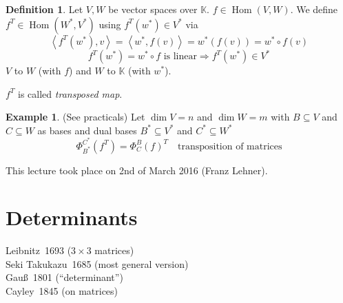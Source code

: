 \documentclass[a4paper,landscape,twocolumn]{article}
\newcommand\meta[3]{This #1 took place on #2 (#3).\par}
\newcommand\functional[1]{\left\langle{#1}\right\rangle}
\theoremstyle{definition}
\newtheorem{defi}{Definition}
\newtheorem{ex}{Example}
\DeclareMathOperator\Hom{Hom} %
\begin{document}
\begin{defi}
  \label{defi-5.32}
  Let $V,W$ be vector spaces over $\mathbb K$. $f \in \Hom(V,W)$.
  We define $f^T \in \Hom(W^*,V^*)$ using $f^T(w^*) \in V^*$ via
  \[ \functional{f^T(w^*),v} = \functional{w^*,f(v)} = w^*(f(v)) = w^* \circ f(v) \]
  \[ f^T(w^*) = w^* \circ f \text{ is linear} \Rightarrow f^T(w^*) \in V^* \]
  $V$ to $W$ (with $f$) and $W$ to $\mathbb K$ (with $w^*$).

  $f^T$ is called \emph{transposed map}.
\end{defi}

\begin{ex}
  (See practicals)
  Let $\dim{V} = n$ and $\dim{W} = m$ with $B \subseteq V$ and $C \subseteq W$ as bases
  and dual bases $B^* \subseteq V^*$ and $C^* \subseteq W^*$
  \[ \Phi_{B^*}^{C^*}(f^T) = \Phi_C^B(f)^T \quad\text{transposition of matrices} \]
\end{ex}

\meta{lecture}{2nd of March 2016}{Franz Lehner}

\section{Determinants}
%
Leibnitz~1693 ($3\times 3$ matrices) \\
Seki Takukazu~1685 (most general version) \\
Gauß~1801 (\enquote{determinant}) \\
Cayley~1845 (on matrices)
\end{document}
